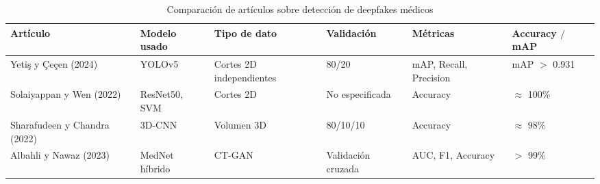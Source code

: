\documentclass[conference]{IEEEtran}
\begin{document}
\begin{table}[ht]
\centering
\caption{Comparación de artículos sobre detección de deepfakes médicos}
\begin{tabular}{|p{1.3cm}|p{1cm}|p{1cm}|p{1.2cm}|p{1cm}|p{1cm}|}
\hline
\textbf{Artículo} & \textbf{Modelo usado} & \textbf{Tipo de dato} & \textbf{Validación} & \textbf{Métricas} & \textbf{Accuracy $/$ mAP} \\
\hline
Yetiş y Çeçen (2024) & YOLOv5 & Cortes 2D independientes & 80/20 & mAP, Recall, Precision & mAP $>$ 0.931 \\
\hline
Solaiyappan y Wen (2022) & ResNet50, SVM & Cortes 2D & No especificada & Accuracy & $\approx$ 100\% \\
\hline
Sharafudeen y Chandra (2022) & 3D-CNN & Volumen 3D & 80/10/10 & Accuracy & $\approx$ 98\% \\
\hline
Albahli y Nawaz (2023) & MedNet híbrido & CT-GAN & Validación cruzada & AUC, F1, Accuracy & $>$ 99\% \\
\hline
\end{tabular}
\label{tab:comparacion-articulos}
\end{table}








\end{document}
